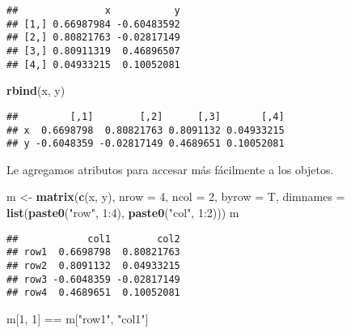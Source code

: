 \documentclass[]{article}
\newenvironment{Shaded}{\begin{snugshade}}{\end{snugshade}}
\newcommand{\KeywordTok}[1]{\textcolor[rgb]{0.13,0.29,0.53}{\textbf{{#1}}}}
\newcommand{\DataTypeTok}[1]{\textcolor[rgb]{0.13,0.29,0.53}{{#1}}}
\newcommand{\DecValTok}[1]{\textcolor[rgb]{0.00,0.00,0.81}{{#1}}}
\newcommand{\StringTok}[1]{\textcolor[rgb]{0.31,0.60,0.02}{{#1}}}
\newcommand{\NormalTok}[1]{{#1}}
\begin{document}
\begin{verbatim}
##               x           y
## [1,] 0.66987984 -0.60483592
## [2,] 0.80821763 -0.02817149
## [3,] 0.80911319  0.46896507
## [4,] 0.04933215  0.10052081
\end{verbatim}

\begin{Shaded}
\begin{Highlighting}[]
\KeywordTok{rbind}\NormalTok{(x, y)}
\end{Highlighting}
\end{Shaded}

\begin{verbatim}
##         [,1]        [,2]      [,3]       [,4]
## x  0.6698798  0.80821763 0.8091132 0.04933215
## y -0.6048359 -0.02817149 0.4689651 0.10052081
\end{verbatim}

Le agregamos atributos para accesar más fácilmente a los objetos.

\begin{Shaded}
\begin{Highlighting}[]
\NormalTok{m <-}\StringTok{ }\KeywordTok{matrix}\NormalTok{(}\KeywordTok{c}\NormalTok{(x, y), }\DataTypeTok{nrow =} \DecValTok{4}\NormalTok{, }\DataTypeTok{ncol =} \DecValTok{2}\NormalTok{, }\DataTypeTok{byrow =} \NormalTok{T,}
            \DataTypeTok{dimnames =} \KeywordTok{list}\NormalTok{(}\KeywordTok{paste0}\NormalTok{(}\StringTok{"row"}\NormalTok{, }\DecValTok{1}\NormalTok{:}\DecValTok{4}\NormalTok{),}
                            \KeywordTok{paste0}\NormalTok{(}\StringTok{"col"}\NormalTok{, }\DecValTok{1}\NormalTok{:}\DecValTok{2}\NormalTok{)))}
\NormalTok{m}
\end{Highlighting}
\end{Shaded}

\begin{verbatim}
##            col1        col2
## row1  0.6698798  0.80821763
## row2  0.8091132  0.04933215
## row3 -0.6048359 -0.02817149
## row4  0.4689651  0.10052081
\end{verbatim}

\begin{Shaded}
\begin{Highlighting}[]
\NormalTok{m[}\DecValTok{1}\NormalTok{, }\DecValTok{1}\NormalTok{] ==}\StringTok{ }\NormalTok{m[}\StringTok{"row1"}\NormalTok{, }\StringTok{"col1"}\NormalTok{]}
\end{Highlighting}
\end{Shaded}
\end{document}
